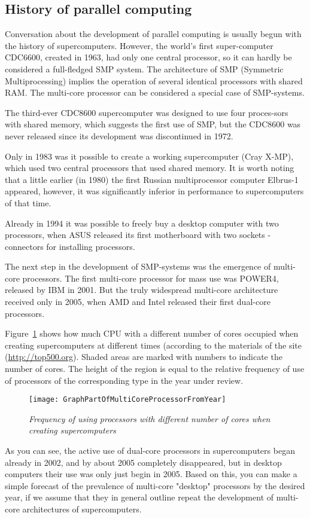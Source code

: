 { %
	\subsection{History of parallel computing}
	\par Conversation about the development of parallel computing is usually begun with the history of supercomputers. However, the world's first super-computer CDC6600, created in 1963, had only one central processor, so it can hardly be considered a full-fledged SMP system. The architecture of SMP (Symmetric Multiprocessing) implies the operation of several identical processors with shared RAM. The multi-core processor can be considered a special case of SMP-systems.
	\par The third-ever CDC8600 supercomputer was designed to use four proces-sors with shared memory, which suggests the first use of SMP, but the CDC8600 was never released since its development was discontinued in 1972.
	\par Only in 1983 was it possible to create a working supercomputer (Cray X-MP), which used two central processors that used shared memory. It is worth noting that a little earlier (in 1980) the first Russian multiprocessor computer Elbrus-1 appeared, however, it was significantly inferior in performance to supercomputers of that time.
	\par Already in 1994 it was possible to freely buy a desktop computer with two processors, when ASUS released its first motherboard with two sockets - connectors for installing processors.
	\par The next step in the development of SMP-systems was the emergence of multi-core processors. The first multi-core processor for mass use was POWER4, released by IBM in 2001. But the truly widespread multi-core architecture received only in 2005, when AMD and Intel released their first dual-core processors.
	\par Figure~\ref{GraphPartOfMultiCoreProcessorFromYear:image} shows how much CPU with a different number of cores occupied when creating supercomputers at different times (according to the materials of the site (\url{http://top500.org}). Shaded areas are marked with numbers to indicate the number of cores. The height of the region is equal to the relative frequency of use of processors of the corresponding type in the year under review.
	\begin{figure}[H]
		\texttt{[image: GraphPartOfMultiCoreProcessorFromYear]}
		\caption{\textit{Frequency of using processors with different number of cores when creating supercomputers}}
		\label{GraphPartOfMultiCoreProcessorFromYear:image}
	\end{figure}
	\par As you can see, the active use of dual-core processors in supercomputers began already in 2002, and by about 2005 completely disappeared, but in desktop computers their use was only just begin in 2005. Based on this, you can make a simple forecast of the prevalence of multi-core "desktop"  processors by the desired year, if we assume that they in general outline repeat the development of multi-core architectures of supercomputers.
	\par
}
